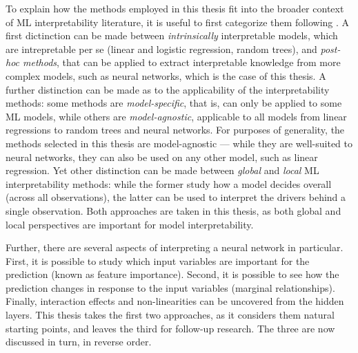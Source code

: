 			To explain how the methods employed in this thesis fit into the broader context of ML interpretability literature, it is useful to first categorize them following \cite{molnar2020interpretable}. A first dictinction can be made between \textit{intrinsically} interpretable models, which are intrepretable per se (linear and logistic regression, random trees), and \textit{post-hoc methods}, that can be applied to extract interpretable knowledge from more complex models, such as neural networks, which is the case of this thesis. A further distinction can be made as to the applicability of the interpretability methods: some methods are \textit{model-specific}, that is, can only be applied to some ML models, while others are \textit{model-agnostic}, applicable to all models from linear regressions to random trees and neural networks. For purposes of generality, the methods selected in this thesis are model-agnostic --- while they are well-suited to neural networks, they can also be used on any other model, such as linear regression. Yet other distinction can be made between \textit{global} and \textit{local} ML interpretability methods: while the former study how a model decides overall (across all observations), the latter can be used to interpret the drivers behind a single observation. Both approaches are taken in this thesis, as both global and local perspectives are important for model interpretability. 
			
			Further, there are several aspects of interpreting a neural network in particular. First, it is possible to study which input variables are important for the prediction (known as feature importance). Second, it is possible to see how the prediction changes in response to the input variables (marginal relationships). Finally, interaction effects and non-linearities can be uncovered from the hidden layers. This thesis takes the first two approaches, as it considers them natural starting points, and leaves the third for follow-up research. The three are now discussed in turn, in reverse order.  

